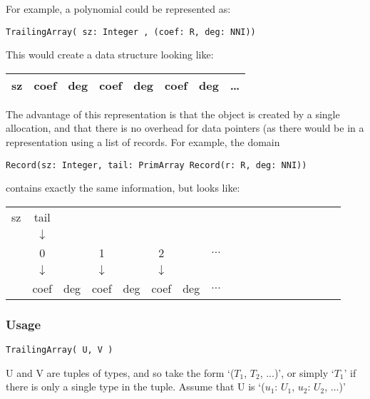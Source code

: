 For example, a polynomial could be represented as:

\verb+TrailingArray( sz: Integer , (coef: R, deg: NNI))+

This would create a data structure looking like:

\begin{tabular}{|c|c|c|c|c|c|c|c}\hline
sz & coef & deg & coef & deg & coef & deg & \dots\\ \hline
\end{tabular}

The advantage of this representation is that the object is created by a single
allocation, and that there is no overhead for data pointers (as there would be
in a representation using a list of records.  For example, the domain

\verb+Record(sz: Integer, tail: PrimArray Record(r: R, deg: NNI))+

contains exactly the same information, but looks like:

\begin{tabular}{cccccccccccccccccc}
sz & tail \\ 
   & $\downarrow$  & \\ 
& 0 & & 1 & & 2 & & $\ldots$ \\ 
& $\downarrow$ & & $\downarrow$ & & $\downarrow$  \\
& coef & deg &coef &deg &coef &deg & $\ldots$ \\ 
\end{tabular}



\subsubsection{Usage}


\verb+TrailingArray( U, V )+

U and V are tuples of types, and so take the form `($T_1$, $T_2$, ...)', or simply
`$T_1$' if there is only a single type in the tuple.  Assume that U is `($u_1$: $U_1$, $u_2$: $U_2$,
$\ldots$)'

